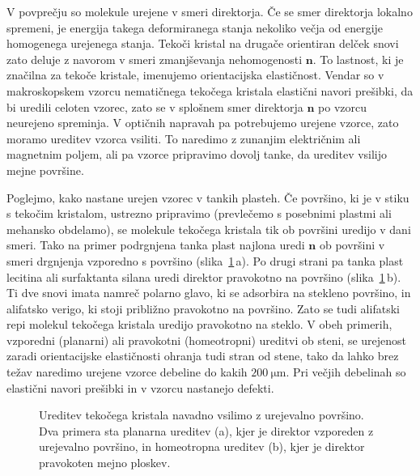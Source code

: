 V povprečju so molekule urejene v smeri direktorja. Če se smer direktorja lokalno
spremeni, je energija takega deformiranega 
stanja nekoliko večja od energije homogenega urejenega stanja. Tekoči kristal na
drugače orientiran delček snovi zato deluje z navorom v smeri zmanjševanja 
nehomogenosti $\mathbf{n}$. To lastnost, ki je značilna za tekoče kristale,
imenujemo orientacijska elastičnost. Vendar so v makroskopskem vzorcu
nematičnega tekočega kristala elastični navori prešibki,
da bi uredili celoten vzorec, zato se v splošnem smer direktorja $\mathbf{n}$ 
po vzorcu neurejeno spreminja. V optičnih napravah pa potrebujemo urejene vzorce, zato
moramo ureditev vzorca vsiliti. To naredimo z zunanjim električnim ali magnetnim poljem, 
ali pa vzorce pripravimo dovolj tanke, da ureditev vsilijo mejne površine. 

Poglejmo, kako nastane urejen vzorec v tankih plasteh. Če površino,
ki je v stiku s tekočim kristalom, ustrezno pripravimo (prevlečemo s posebnimi 
plastmi ali mehansko obdelamo), se molekule tekočega kristala tik ob površini uredijo
v dani smeri.
Tako na primer podrgnjena tanka plast najlona uredi $\mathbf{n}$ ob površini v smeri
drgnjenja vzporedno s površino (slika~\ref{s7.20a}\,a). Po drugi strani pa tanka plast lecitina ali 
surfaktanta silana uredi direktor pravokotno na površino (slika~\ref{s7.20a}\,b). Ti dve snovi imata namreč
polarno glavo, ki se adsorbira na stekleno površino, in alifatsko verigo, 
ki stoji približno pravokotno na površino. Zato se tudi alifatski repi molekul
tekočega kristala uredijo pravokotno na steklo. V obeh primerih, 
vzporedni (planarni) ali pravokotni (homeotropni) ureditvi ob steni, 
se urejenost zaradi orientacijske elastičnosti
ohranja tudi stran od stene, tako da lahko brez težav naredimo urejene
vzorce debeline do kakih $200~\si{\micro\metre}$. Pri večjih debelinah so elastični
navori prešibki in v vzorcu nastanejo defekti.
\begin{figure}[h]
\centering
\def\svgwidth{120truemm} 

\caption{Ureditev tekočega kristala navadno vsilimo z urejevalno površino. Dva primera
sta planarna ureditev (a), kjer je direktor vzporeden z urejevalno površino, in 
homeotropna ureditev (b), kjer je direktor pravokoten mejno ploskev.}
\label{s7.20a}
\end{figure}
 
